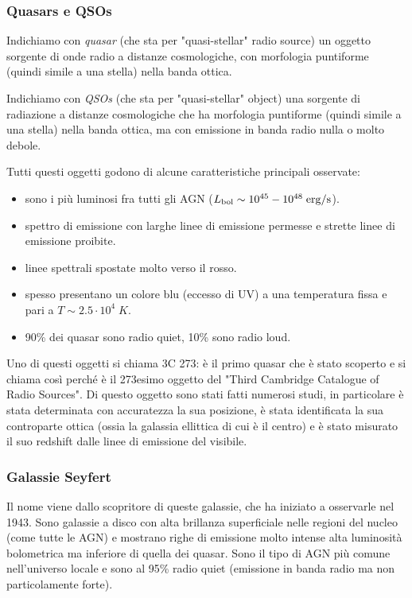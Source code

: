 \subsubsection{Quasars e QSOs}
Indichiamo con \emph{quasar} (che sta per "quasi-stellar" radio source) un oggetto sorgente di onde radio a distanze cosmologiche, con morfologia puntiforme (quindi simile a una stella) nella banda ottica. 

Indichiamo con \emph{QSOs} (che sta per "quasi-stellar" object) una sorgente di radiazione a distanze cosmologiche che ha morfologia puntiforme (quindi simile a una stella) nella banda ottica, ma con emissione in banda radio nulla o molto debole.

Tutti questi oggetti godono di alcune caratteristiche principali osservate:
\begin{itemize}
    \item sono i più luminosi fra tutti gli AGN ($L_\textup{bol} \sim 10^{45}-10^{48} \;\si{erg}/\si{s}$).
    \item spettro di emissione con larghe linee di emissione permesse e strette linee di emissione proibite.
    \item linee spettrali spostate molto verso il rosso.
    \item spesso presentano un colore blu (eccesso di UV) a una temperatura fissa e pari a $T\sim 2.5\cdot 10^4 \;\si{K}$.
    \item 90\% dei quasar sono radio quiet, 10\% sono radio loud.
\end{itemize}

Uno di questi oggetti si chiama 3C 273: è il primo quasar che è stato scoperto e si chiama così perché è il 273esimo oggetto del "Third Cambridge Catalogue of Radio Sources". Di questo oggetto sono stati fatti numerosi studi, in particolare è stata determinata con accuratezza la sua posizione, è stata identificata la sua controparte ottica (ossia la galassia ellittica di cui è il centro) e è stato misurato il suo redshift dalle linee di emissione del visibile. 

\subsubsection{Galassie Seyfert}
Il nome viene dallo scopritore di queste galassie, che ha iniziato a osservarle nel 1943. Sono galassie a disco con alta brillanza superficiale nelle regioni del nucleo (come tutte le AGN) e mostrano righe di emissione molto intense alta luminosità bolometrica ma inferiore di quella dei quasar.
Sono il tipo di AGN più comune nell’universo locale e sono al 95\% radio quiet (emissione in banda radio ma non particolamente forte).

